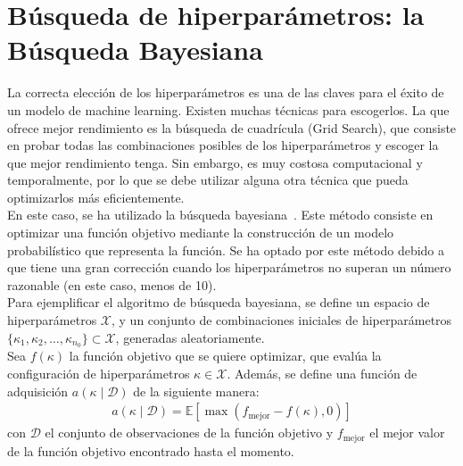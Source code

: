 \documentclass[11pt]{book}
\theoremstyle{plain} %
\theoremstyle{definition} %
\begin{document}
\section{Búsqueda de hiperparámetros: la Búsqueda Bayesiana}
La correcta elección de los hiperparámetros es una de las claves para 
el éxito de un modelo de machine learning. Existen muchas técnicas para 
escogerlos. La que ofrece mejor rendimiento es la búsqueda de cuadrícula 
(Grid Search), que consiste en probar todas las combinaciones posibles de los
hiperparámetros y escoger la que mejor rendimiento tenga. Sin embargo,
es muy costosa computacional y temporalmente, por lo que 
se debe utilizar alguna otra técnica que pueda optimizarlos más 
eficientemente. \\ 

En este caso, se ha utilizado la búsqueda bayesiana~\cite{Frazier18}. Este 
método consiste en optimizar una función objetivo mediante la 
construcción de un modelo probabilístico que representa la función. Se ha 
optado por este método debido a que tiene una gran corrección cuando 
los hiperparámetros no superan un número razonable (en este caso,
menos de 10). \\ 

Para ejemplificar el algoritmo de búsqueda bayesiana, se define un espacio 
de hiperparámetros $\mathcal{X}$, y un conjunto de combinaciones iniciales 
de hiperparámetros $\{\kappa_1, \kappa_2, \dots, \kappa_{n_0}\} \subset \mathcal{X}$, 
generadas aleatoriamente.\\

Sea $f(\kappa)$ la función objetivo que se quiere optimizar, que evalúa la 
configuración de hiperparámetros $\kappa \in \mathcal{X}$.  Además, se define 
una función de adquisición $a(\kappa \mid \mathcal{D})$ de la siguiente manera:
\begin{align*}
   a(\kappa \mid \mathcal{D}) = \mathbb{E} \left[ \max(f_{\text{mejor}} - f(\kappa), 0) \right]
\end{align*}
con $\mathcal{D}$ el conjunto de observaciones de la función objetivo y
$f_{\text{mejor}}$ el mejor valor de la función objetivo encontrado hasta el 
momento.\\
\end{document}
